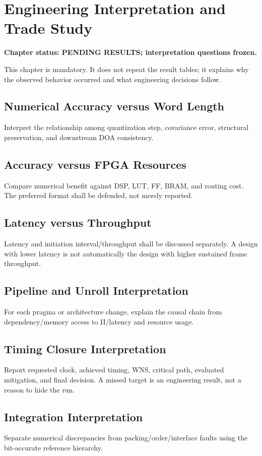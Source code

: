 \chapter{Engineering Interpretation and Trade Study}
\label{ch:engineering-interpretation}
\textbf{Chapter status: PENDING RESULTS; interpretation questions frozen.}

This chapter is mandatory. It does not repeat the result tables; it explains why the observed
behavior occurred and what engineering decisions follow.

\section{Numerical Accuracy versus Word Length}
Interpret the relationship among quantization step, covariance error, structural preservation,
and downstream DOA consistency.

\section{Accuracy versus FPGA Resources}
Compare numerical benefit against DSP, LUT, FF, BRAM, and routing cost. The preferred
format shall be defended, not merely reported.

\section{Latency versus Throughput}
Latency and initiation interval/throughput shall be discussed separately. A design with lower
latency is not automatically the design with higher sustained frame throughput.

\section{Pipeline and Unroll Interpretation}
For each pragma or architecture change, explain the causal chain from dependency/memory
access to II/latency and resource usage.

\section{Timing Closure Interpretation}
Report requested clock, achieved timing, WNS, critical path, evaluated mitigation, and final
decision. A missed target is an engineering result, not a reason to hide the run.

\section{Integration Interpretation}
Separate numerical discrepancies from packing/order/interface faults using the bit-accurate
reference hierarchy.

